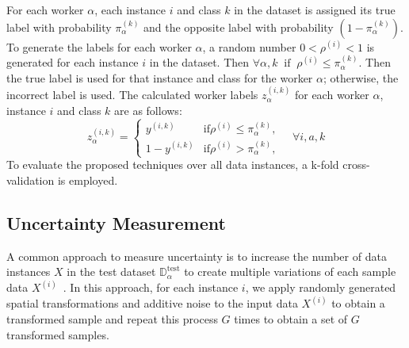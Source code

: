 \documentclass[sn-nature]{bst/sn-jnl}
\begin{document}
For each worker $\alpha $, each instance $i $ and class $k $ in the dataset is assigned its true label with probability $\pi_\alpha^{(k)}$ and the opposite label with probability $ (1-\pi_\alpha^{(k)})$. To generate the labels for each worker $\alpha $, a random number $0 < \rho^{(i)} < 1 $ is generated for each instance $i $ in the dataset. Then $\forall \alpha,k \; \; \text{if} \; \; \rho^{(i)}\leq \pi_\alpha^{(k)}$. Then the true label is used for that instance and class for the worker $\alpha $; otherwise, the incorrect label is used.
The calculated worker labels $z_{\alpha}^{(i,k)} $ for each worker $\alpha $, instance $i $ and class $k $ are as follows:
\begin{equation}
    z_{\alpha}^{(i,k)} =
    \begin{cases}
        y^{(i,k)} & \text{if} \rho^{(i)}  \leq \pi_\alpha^{(k)} , \\
        1 - y^{(i,k)} & \text{if} \rho^{(i)} > \pi_\alpha^{(k)} ,
    \end{cases} \quad \forall i, a, k
    \label{eq:crowd.Eq.4.fictitious_label}
\end{equation}
To evaluate the proposed techniques over all data instances, a k-fold cross-validation is employed.
\subsection{Uncertainty Measurement}\label{subsec:crowd.uncertainty}
A common approach to measure uncertainty is to increase the number of data instances $X $ in the test dataset $\mathbb{D}_\alpha^{\mathrm{test}} $ to create multiple variations of each sample data $X^{(i)} $~\cite{ayhan_TestTime_2018}. In this approach, for each instance $i $, we apply randomly generated spatial transformations and additive noise to the input data $X^{(i)} $ to obtain a transformed sample and repeat this process $G $ times to obtain a set of $G $ transformed samples.
\end{document}
